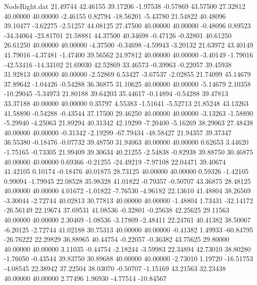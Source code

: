 \begin{filecontents}{NodeRight.dat}
  21.49744   42.46155   39.17206    -1.97538   -0.57869   43.57500   27.32812   40.00000   40.00000   -2.46155    0.82794  -18.56201   -5.43780
  21.54822   40.48096   39.10477    -3.62275   -2.51257   44.08125   27.47500   40.00000   40.00000   -0.48096    0.89523  -34.34064  -23.81701
  21.58881   44.37500   40.34698    -0.47126   -0.32801   40.61250   26.61250   40.00000   40.00000   -4.37500   -0.34698   -4.59943   -3.20132
  21.63972   43.40149   41.79016    -4.37481   -1.47400   39.56562   24.97812   40.00000   40.00000   -3.40149   -1.79016  -42.53416  -14.33102
  21.69030   42.52869   33.46573    -0.39963   -0.22057   39.45938   31.92813   40.00000   40.00000   -2.52869    6.53427   -3.67537   -2.02855
  21.74099   45.14679   37.89642    -1.04426   -0.54288   36.36875   31.10625   40.00000   40.00000   -5.14679    2.10358  -10.29045   -5.34973
  21.80188   39.64203   35.44617    -0.14894   -0.54288   39.47813   33.37188   40.00000   40.00000    0.35797    4.55383   -1.51641   -5.52713
  21.85248   43.13263   41.58890    -0.54288   -0.43544   37.17500   29.46250   40.00000   40.00000   -3.13263   -1.58890   -5.29940   -4.25063
  21.89294   40.31342   42.19299    -7.20400   -5.16269   38.29063   27.48438   40.00000   40.00000   -0.31342   -2.19299  -67.79434  -48.58427
  21.94357   39.37347   36.55380    -0.18476   -0.07732   39.48750   31.94063   40.00000   40.00000    0.62653    3.44620   -1.75165   -0.73305
  21.99409   39.30634   40.21255    -2.54838   -0.82938   39.88750   30.46875   40.00000   40.00000    0.69366   -0.21255  -24.49219   -7.97108
  22.04471   39.40674   41.42105     0.10174   -0.18476   40.01875   28.73125   40.00000   40.00000    0.59326   -1.42105    0.99094   -1.79945
  22.08528   35.98328   41.01822    -0.79357   -0.50707   43.36875   28.48125   40.00000   40.00000    4.01672   -1.01822   -7.76530   -4.96182
  22.13610   41.48804   38.26569    -3.30044   -2.72744   40.02813   30.77813   40.00000   40.00000   -1.48804    1.73431  -32.14172  -26.56149
  22.19674   37.69531   41.08536    -0.32801   -0.25638   42.25625   29.11563   40.00000   40.00000    2.30469   -1.08536   -3.17809   -2.48411
  22.24761   40.41382   38.50067    -6.20125   -2.72744   41.02188   30.75313   40.00000   40.00000   -0.41382    1.49933  -60.84795  -26.76222
  22.29829   36.88965   40.44754    -0.22057   -0.36382   43.75625   29.80000   40.00000   40.00000    3.11035   -0.44754   -2.18244   -3.59983
  22.34894   42.73010   38.80280    -1.76050   -0.43544   39.83750   30.89688   40.00000   40.00000   -2.73010    1.19720  -16.51753   -4.08545
  22.38942   37.22504   38.03070    -0.50707   -1.15169   43.21563   32.23438   40.00000   40.00000    2.77496    1.96930   -4.77514  -10.84567

\end{filecontents}
